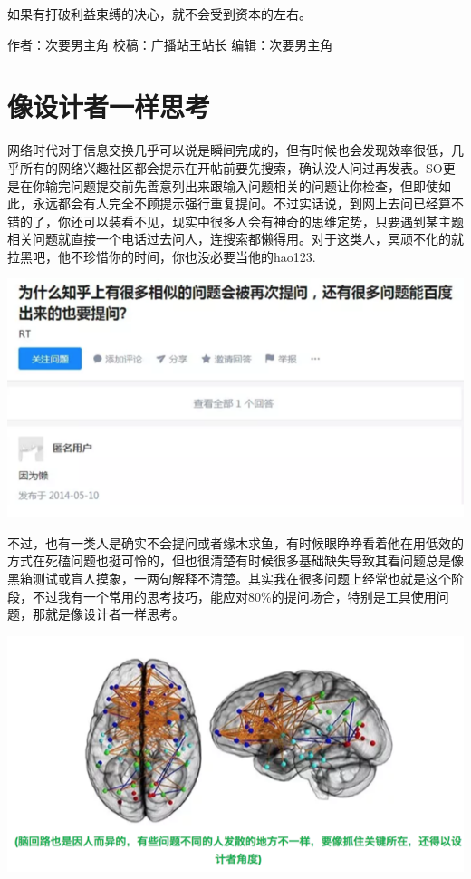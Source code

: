\documentclass[]{book}
\begin{document}
如果有打破利益束缚的决心，就不会受到资本的左右。

作者：次要男主角
校稿：广播站王站长
编辑：次要男主角

\hypertarget{ux50cfux8bbeux8ba1ux8005ux4e00ux6837ux601dux8003}{%
\section{像设计者一样思考}\label{ux50cfux8bbeux8ba1ux8005ux4e00ux6837ux601dux8003}}

网络时代对于信息交换几乎可以说是瞬间完成的，但有时候也会发现效率很低，几乎所有的网络兴趣社区都会提示在开帖前要先搜索，确认没人问过再发表。SO更是在你输完问题提交前先善意列出来跟输入问题相关的问题让你检查，但即使如此，永远都会有人完全不顾提示强行重复提问。不过实话说，到网上去问已经算不错的了，你还可以装看不见，现实中很多人会有神奇的思维定势，只要遇到某主题相关问题就直接一个电话过去问人，连搜索都懒得用。对于这类人，冥顽不化的就拉黑吧，他不珍惜你的时间，你也没必要当他的hao123.

\includegraphics[width=8.33in]{images/sheji1}

不过，也有一类人是确实不会提问或者缘木求鱼，有时候眼睁睁看着他在用低效的方式在死磕问题也挺可怜的，但也很清楚有时候很多基础缺失导致其看问题总是像黑箱测试或盲人摸象，一两句解释不清楚。其实我在很多问题上经常也就是这个阶段，不过我有一个常用的思考技巧，能应对80\%的提问场合，特别是工具使用问题，那就是像设计者一样思考。

\includegraphics[width=8.33in]{images/sheji2}
\end{document}
